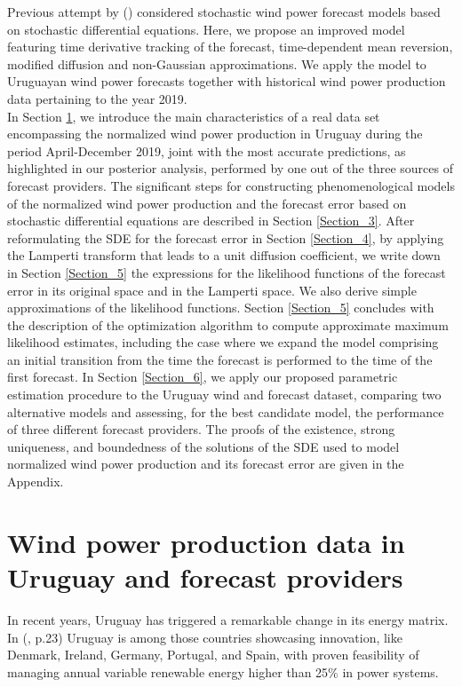 \documentclass[11pt]{article}
\theoremstyle{definition}
\begin{document}
Previous attempt by (\cite{mozuma}) considered stochastic wind power forecast models based on stochastic differential equations. Here, we propose an improved model featuring time derivative tracking of the forecast, time-dependent mean reversion, modified diffusion and non-Gaussian approximations. We apply the model to Uruguayan wind power forecasts together with historical wind power production data pertaining to the year 2019. \\

In Section \ref{Section_2}, we introduce the main characteristics of a real data set encompassing the normalized wind power production in Uruguay during the period April-December 2019, joint with the most accurate predictions, as highlighted in our posterior analysis, performed by one out of the three sources of forecast providers. The significant steps for constructing phenomenological models of the normalized wind power production and the forecast error based on stochastic differential equations are described in Section \ref{Section_3}. After reformulating the SDE for the forecast error in Section \ref{Section_4}, by applying the Lamperti transform that leads to a unit diffusion coefficient, we write down in Section \ref{Section_5} the expressions for the likelihood functions of the forecast error in its original space and in the Lamperti space. We also derive simple approximations of the likelihood functions. Section \ref{Section_5} concludes with the description of the optimization algorithm to compute approximate maximum likelihood estimates, including the case where we expand the model comprising an initial transition from the time the forecast is performed to the time of the first forecast.  
In Section \ref{Section_6}, we apply our proposed parametric estimation procedure to the Uruguay wind and forecast dataset, comparing two alternative models and assessing, for the best candidate model, the performance of three different forecast providers.
The proofs of the existence, strong uniqueness, and boundedness of the solutions of the SDE used to model normalized wind power production and its forecast error are given in the Appendix.


\section{Wind power production data in Uruguay and forecast providers } \label{Section_2}

In recent years, Uruguay has triggered a remarkable change in its energy matrix. In (\cite{irena}, p.23) Uruguay is among those countries showcasing innovation, like Denmark, Ireland, Germany, Portugal, and Spain, with proven feasibility of managing annual variable renewable energy higher than 25\% in power systems. 
\end{document}
